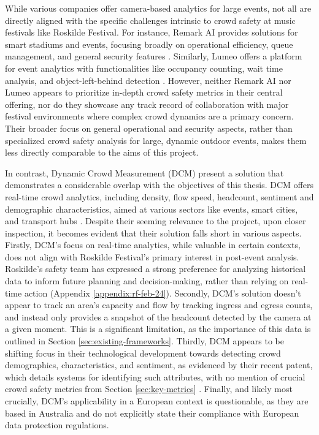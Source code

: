 While various companies offer camera-based analytics for large events, not all are directly aligned with the specific challenges intrinsic to crowd safety at music festivals like Roskilde Festival. For instance, Remark AI provides solutions for smart stadiums and events, focusing broadly on operational efficiency, queue management, and general security features \cite{remark_ai}. Similarly, Lumeo offers a platform for event analytics with functionalities like occupancy counting, wait time analysis, and object-left-behind detection \cite{lumeo}. However, neither Remark AI nor Lumeo appears to prioritize in-depth crowd safety metrics in their central offering, nor do they showcase any track record of collaboration with major festival environments where complex crowd dynamics are a primary concern. Their broader focus on general operational and security aspects, rather than specialized crowd safety analysis for large, dynamic outdoor events, makes them less directly comparable to the aims of this project.

In contrast, Dynamic Crowd Measurement (DCM) present a solution that demonstrates a considerable overlap with the objectives of this thesis. DCM offers real-time crowd analytics, including density, flow speed, headcount, sentiment and demographic characteristics, aimed at various sectors like events, smart cities, and transport hubs \cite{dcm}. Despite their seeming relevance to the project, upon closer inspection, it becomes evident that their solution falls short in various aspects. Firstly, DCM's focus on real-time analytics, while valuable in certain contexts, does not align with Roskilde Festival's primary interest in post-event analysis. Roskilde's safety team has expressed a strong preference for analyzing historical data to inform future planning and decision-making, rather than relying on real-time action (Appendix \ref{appendix:rf-feb-24}). Secondly, DCM's solution doesn't appear to track an area's capacity and flow by tracking ingress and egress counts, and instead only provides a snapshot of the headcount detected by the camera at a given moment. This is a significant limitation, as the importance of this data is outlined in Section \ref{sec:existing-frameworks}. Thirdly, DCM appears to be shifting focus in their technological development towards detecting crowd demographics, characteristics, and sentiment, as evidenced by their recent patent, which details systems for identifying such attributes, with no mention of crucial crowd safety metrics from Section \ref{sec:key-metrics} \cite{dcm_patent}. Finally, and likely most crucially, DCM's applicability in a European context is questionable, as they are based in Australia and do not explicitly state their compliance with European data protection regulations.

